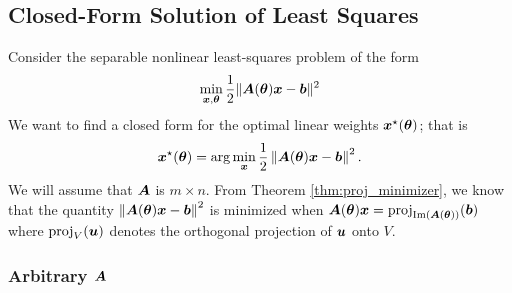 \subsection{Closed-Form Solution of Least Squares}
Consider the separable nonlinear least-squares problem of the form
    \begin{align*}\label{eq:leastsquares}
        \min_{\boldsymbol{x}, \boldsymbol{\theta}} \frac{1}{2}\|\boldsymbol{A}(\boldsymbol{\theta}) \boldsymbol{x} - \boldsymbol{b}\|^2
    \end{align*}
We want to find a closed form for the optimal linear weights $\boldsymbol{x}^\star(\boldsymbol{\theta})$; that is
    \begin{align*}
        \boldsymbol{x}^\star(\boldsymbol{\theta}) = \arg\min_{\boldsymbol{x}} \frac{1}{2}\left\Vert\boldsymbol{A}(\boldsymbol{\theta}) \boldsymbol{x} - \boldsymbol{b}\right\Vert^2.
    \end{align*}
We will assume that $\boldsymbol{A}$ is $m\times n$. From Theorem \ref{thm:proj_minimizer}, we know that the quantity $\left\Vert\boldsymbol{A}(\boldsymbol{\theta}) \boldsymbol{x} - \boldsymbol{b}\right\Vert^2$ is minimized when $\boldsymbol{A}(\boldsymbol{\theta})\boldsymbol{x}=\operatorname{proj}_{\operatorname{Im}(\boldsymbol{A}(\boldsymbol{\theta}))}(\boldsymbol{b})$ where $\operatorname{proj}_V(\boldsymbol{u})$ denotes the orthogonal projection of $\boldsymbol{u}$ onto $V$.

\subsubsection{Arbitrary $\boldsymbol{A}$}

